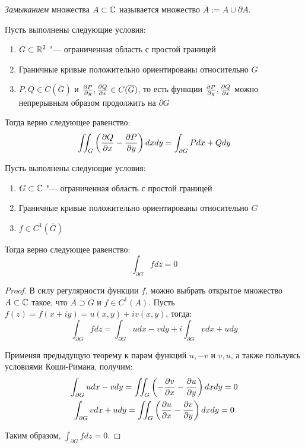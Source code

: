 \begin{definition}
	\textit{Замыканием} множества $A \subset \mathbb{C}$ называется множество $\overline{A} := A \cup \partial A$.
\end{definition}

\begin{theorem}
	Пусть выполнены следующие условия:
	\begin{enumerate}
		\item $G \subset \mathbb{R}^2$ "--- ограниченная область с простой границей
		
		\item Граничные кривые положительно ориентированы относительно $G$
		
		\item $P, Q \in C(\overline{G})$ и $\frac{\partial P}{\partial y}, \frac{\partial Q}{\partial x} \in C(\overline{G})$, то есть функции $\frac{\partial P}{\partial y}, \frac{\partial Q}{\partial x}$ можно непрерывным образом продолжить на $\partial G$
	\end{enumerate}
	
	Тогда верно следующее равенство:
	\[\iint_G\left(\frac{\partial Q}{\partial x} - \frac{\partial P}{\partial y}\right)dxdy = \int_{\partial G} Pdx + Qdy\]
\end{theorem}

\begin{theorem}
	Пусть выполнены следующие условия:
	\begin{enumerate}
		\item $G \subset \mathbb{C}$ "--- ограниченная область с простой границей
		
		\item Граничные кривые положительно ориентированы относительно $G$
		
		\item $f \in C^1(\overline{G})$
	\end{enumerate}

	Тогда верно следующее равенство:
	\[\int_{\partial G} fdz = 0\]
\end{theorem}

\begin{proof}
	В силу регулярности функции $f$, можно выбрать открытое множество $A \subset \mathbb{C}$ такое, что $A \supset \overline{G}$ и $f \in C^1(A)$. Пусть $f(z) = f(x + iy) = u(x, y) + iv(x, y)$, тогда:
	\[\int_{\partial G} fdz = \int_{\partial G} udx - vdy + i\int_{\partial G} vdx + udy\]
	
	Применяя предыдущую теорему к парам функций $u, -v$ и $v, u$, а также пользуясь условиями Коши-Римана, получим:
	\begin{gather*}
		\int_{\partial G} udx - vdy  = \iint_G \left(-\frac{\partial v}{\partial x} - \frac{\partial u}{\partial y}\right)dxdy = 0
		\\
		\int_{\partial G} vdx + udy  = \iint_G \left(\frac{\partial u}{\partial x} - \frac{\partial v}{\partial y}\right)dxdy = 0
	\end{gather*}

	Таким образом, $\int_{\partial G} fdz = 0$.
\end{proof}

